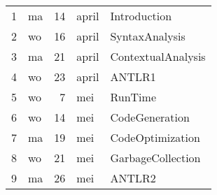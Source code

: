 \begin{tabular}{rlrll}
 1 & ma & 14 & april & Introduction \\
 2 & wo & 16 & april & SyntaxAnalysis \\
 3 & ma & 21 & april & ContextualAnalysis \\
 4 & wo & 23 & april & ANTLR1 \\
 5 & wo &  7 & mei   & RunTime \\
 6 & wo & 14 & mei   & CodeGeneration \\
 7 & ma & 19 & mei   & CodeOptimization \\
 8 & wo & 21 & mei   & GarbageCollection \\
 9 & ma & 26 & mei   & ANTLR2 \\
\end{tabular}

